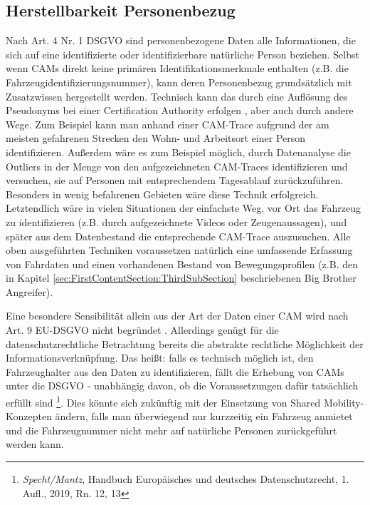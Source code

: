 
\subsection{Herstellbarkeit Personenbezug}
\label{sec:SecondContentSection:SecondSubsection:SecondSubSubsection}

Nach Art. 4 Nr. 1 DSGVO sind personenbezogene Daten alle Informationen, die sich auf eine identifizierte oder identifizierbare natürliche Person beziehen. Selbst wenn CAMs direkt keine primären Identifikationsmerkmale enthalten (z.B. die Fahrzeugidentifizierungsnummer), kann deren Personenbezug grundsätzlich mit Zusatzwissen hergestellt werden. Technisch kann das durch eine Auflösung des Pseudonyms bei einer Certification Authority erfolgen \cite{Kiometzis2017}, aber auch durch andere Wege. Zum Beispiel kann man anhand einer CAM-Trace aufgrund der am meisten gefahrenen Strecken den Wohn- und Arbeitsort einer Person identifizieren. Außerdem wäre es zum Beispiel möglich, durch Datenanalyse die Outliers in der Menge von den aufgezeichneten CAM-Traces identifizieren und versuchen, sie auf Personen mit entsprechendem Tagesablauf zurückzuführen. Besonders in wenig befahrenen Gebieten wäre diese Technik erfolgreich. Letztendlich wäre in vielen Situationen der einfachste Weg, vor Ort das Fahrzeug zu identifizieren (z.B. durch aufgezeichnete Videos oder Zeugenaussagen), und später aus dem Datenbestand die entsprechende CAM-Trace auszusuchen. Alle oben ausgeführten Techniken voraussetzen natürlich eine umfassende Erfassung von Fahrdaten und einen vorhandenen Bestand von Bewegungsprofilen (z.B. den in Kapitel \ref{sec:FirstContentSection:ThirdSubSection} beschriebenen Big Brother Angreifer).

Eine besondere Sensibilität allein aus der Art der Daten einer CAM wird nach Art. 9 EU-DSGVO nicht begründet \cite{Weichert2016}. Allerdings genügt für die datenschutzrechtliche Betrachtung bereits die abstrakte rechtliche Möglichkeit der Informationsverknüpfung. Das heißt: falls es technisch möglich ist, den Fahrzeughalter aus den Daten zu identifizieren, fällt die Erhebung von CAMs unter die DSGVO - unabhängig davon, ob die Voraussetzungen dafür tatsächlich erfüllt sind  \footnote{\emph{Specht/Mantz}, Handbuch Europäisches und deutsches Datenschutzrecht, 1. Aufl., 2019, Rn. 12, 13}. Dies könnte sich zukünftig mit der Einsetzung von Shared Mobility-Konzepten ändern, falls man überwiegend nur kurzzeitig ein Fahrzeug anmietet und die Fahrzeugnummer nicht mehr auf natürliche Personen zurückgeführt werden kann. 


